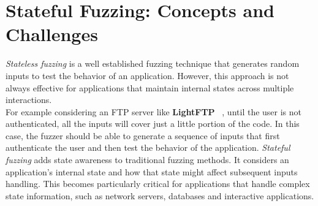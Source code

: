 \section{Stateful Fuzzing: Concepts and Challenges}
\textit{Stateless fuzzing} is a well established fuzzing technique that generates random inputs to test the behavior of an application. However, this approach is not always effective for applications that maintain internal states across multiple interactions.
\\For example considering an FTP server like \textbf{LightFTP} ~\cite{lightftp}, until the user is not authenticated, all the inputs will cover just a little portion of the code. In this case, the fuzzer should be able to generate a sequence of inputs that first authenticate the user and then test the behavior of the application.
\textit{Stateful fuzzing} adds state awareness to traditional fuzzing methods. It considers an application's internal state and how that state might affect subsequent inputs handling. This becomes particularly critical for applications that handle complex state information, such as network servers, databases and interactive applications.

